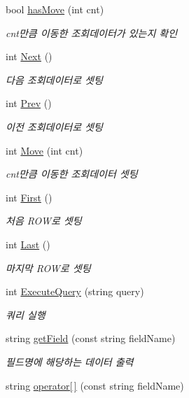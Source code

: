 \begin{DoxyCompactItemize}
bool \hyperlink{classCMySql_a7748c82b0baa453b5cadf7ee209e3998}{hasMove} (int cnt)
\begin{DoxyCompactList}\small\item\em cnt만큼 이동한 조회데이터가 있는지 확인 \item\end{DoxyCompactList}\item 
int \hyperlink{classCMySql_ab68631ceb288121957589643cd096757}{Next} ()
\begin{DoxyCompactList}\small\item\em 다음 조회데이터로 셋팅 \item\end{DoxyCompactList}\item 
int \hyperlink{classCMySql_a579e51c63985da9d8a0bd9a6b463879a}{Prev} ()
\begin{DoxyCompactList}\small\item\em 이전 조회데이터로 셋팅 \item\end{DoxyCompactList}\item 
int \hyperlink{classCMySql_a92ff6e04a1a7985494e948884d4ab8fb}{Move} (int cnt)
\begin{DoxyCompactList}\small\item\em cnt만큼 이동한 조회데이터 셋팅 \item\end{DoxyCompactList}\item 
int \hyperlink{classCMySql_ab356f387b622ff7b977b720f66438d2a}{First} ()
\begin{DoxyCompactList}\small\item\em 처음 ROW로 셋팅 \item\end{DoxyCompactList}\item 
int \hyperlink{classCMySql_af8409e3cd8cb029fa1823efe99e7524b}{Last} ()
\begin{DoxyCompactList}\small\item\em 마지막 ROW로 셋팅 \item\end{DoxyCompactList}\item 
int \hyperlink{classCMySql_a829b67873c1ccc01565d19c7dbac717b}{ExecuteQuery} (string query)
\begin{DoxyCompactList}\small\item\em 쿼리 실행 \item\end{DoxyCompactList}\item 
string \hyperlink{classCMySql_a47f9180acc8779dce03902cf3edcc598}{getField} (const string fieldName)
\begin{DoxyCompactList}\small\item\em 필드명에 해당하는 데이터 출력 \item\end{DoxyCompactList}\item 
string \hyperlink{classCMySql_ab282013a24a7629a8fbfd5520e13bf0e}{operator\mbox{[}$\,$\mbox{]}} (const string fieldName)
\end{DoxyCompactItemize}
